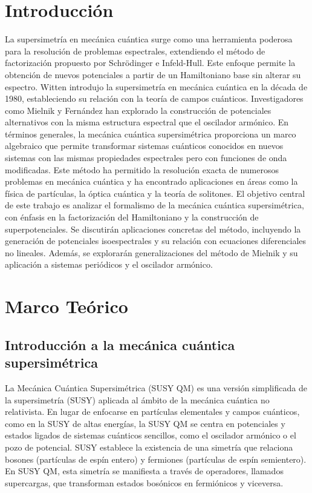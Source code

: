 \documentclass[%
 aip,
 jmp,%
 amsmath,amssymb,
 reprint,
]{revtex4-2}
\begin{document}
\section{Introducción}
La supersimetría en mecánica cuántica surge como una herramienta poderosa para la resolución de problemas espectrales, extendiendo el método de factorización propuesto por Schrödinger e Infeld-Hull. Este enfoque permite la obtención de nuevos potenciales a partir de un Hamiltoniano base sin alterar su espectro. Witten introdujo la supersimetría en mecánica cuántica en la década de 1980, estableciendo su relación con la teoría de campos cuánticos. Investigadores como Mielnik y Fernández han explorado la construcción de potenciales alternativos con la misma estructura espectral que el oscilador armónico.
En términos generales, la mecánica cuántica supersimétrica proporciona un marco algebraico que permite transformar sistemas cuánticos conocidos en nuevos sistemas con las mismas propiedades espectrales pero con funciones de onda modificadas. Este método ha permitido la resolución exacta de numerosos problemas en mecánica cuántica y ha encontrado aplicaciones en áreas como la física de partículas, la óptica cuántica y la teoría de solitones.
El objetivo central de este trabajo es analizar el formalismo de la mecánica cuántica supersimétrica, con énfasis en la factorización del Hamiltoniano y la construcción de superpotenciales. Se discutirán aplicaciones concretas del método, incluyendo la generación de potenciales isoespectrales y su relación con ecuaciones diferenciales no lineales. Además, se explorarán generalizaciones del método de Mielnik y su aplicación a sistemas periódicos y el oscilador armónico.

\section{Marco Teórico}
\subsection{Introducción a la mecánica cuántica supersimétrica}
La Mecánica Cuántica Supersimétrica (SUSY QM) es una versión simplificada de la supersimetría (SUSY) aplicada al ámbito de la mecánica cuántica no relativista. En lugar de enfocarse en partículas elementales y campos cuánticos, como en la SUSY de altas energías, la SUSY QM se centra en potenciales y estados ligados de sistemas cuánticos sencillos, como el oscilador armónico o el pozo de potencial.
SUSY establece la existencia de una simetría que relaciona bosones (partículas de espín entero) y fermiones (partículas de espín semientero). En SUSY QM, esta simetría se manifiesta a través de operadores, llamados supercargas, que transforman estados bosónicos en fermiónicos y viceversa.
\end{document}
